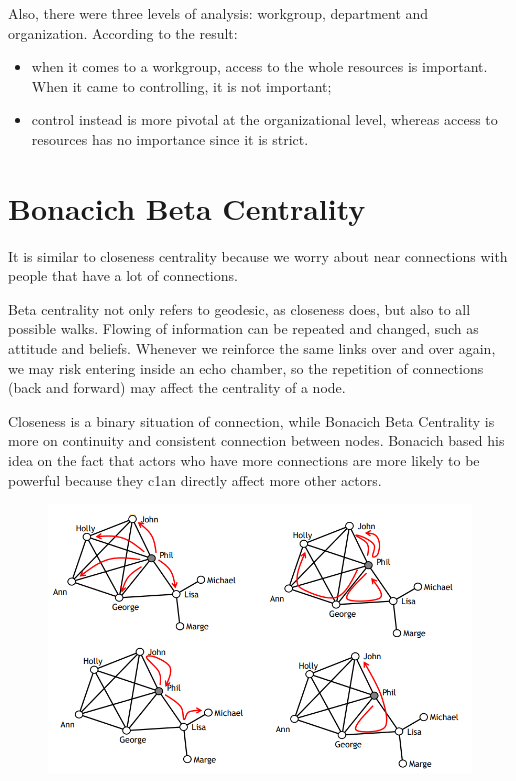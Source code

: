 \documentclass[
  notitlepage,
  onecolumn,
  openany]{book}
\begin{document}
Also, there were three levels of analysis: workgroup, department and organization. According to the result:

\begin{itemize}
\item
  when it comes to a workgroup, access to the whole resources is important. When it came to controlling, it is not important;
\item
  control instead is more pivotal at the organizational level, whereas access to resources has no importance since it is strict.
\end{itemize}

\hypertarget{bonacich-beta-centrality}{%
\section{Bonacich Beta Centrality}\label{bonacich-beta-centrality}}

It is similar to closeness centrality because we worry about near connections with people that have a lot of connections.

Beta centrality not only refers to geodesic, as closeness does, but also to all possible walks. Flowing of information can be repeated and changed, such as attitude and beliefs. Whenever we reinforce the same links over and over again, we may risk entering inside an echo chamber, so the repetition of connections (back and forward) may affect the centrality of a node.

Closeness is a binary situation of connection, while Bonacich Beta Centrality is more on continuity and consistent connection between nodes. Bonacich based his idea on the fact that actors who have more connections are more likely to be powerful because they c1an directly affect more other actors.

\begin{figure}[h!]

{\centering \includegraphics[width=0.6\linewidth]{images/04-Centrality/Untitled 7} 

}

\end{figure}
\end{document}
